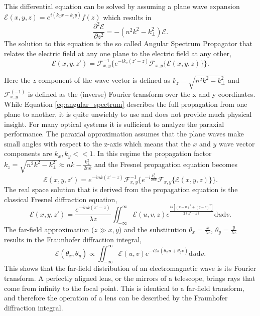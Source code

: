 \documentclass[letterpaper]{ar-1col}
\begin{document}
This differential equation can be solved by assuming a plane wave expansion $\mathcal{E}(x,y,z)=e^{i(k_x x + k_y y)}f(z)$ which results in
\begin{equation}
\frac{\partial^2\mathcal{E}}{\partial z^2} = -(n^2k^2 - k_{\perp}^2)\mathcal{E}.
\end{equation}
The solution to this equation is the so called Angular Spectrum Propagator that relates the electric field at any one plane to the electric field at any other,
\begin{equation}
\label{eq:angular_spectrum}
\mathcal{E}(x, y, z') = \mathcal{F}_{x,y}^{-1}\{e^{-ik_z(z'-z)}\mathcal{F}_{x,y}\{\mathcal{E}(x,y,z)\}\}.
\end{equation}

Here the $z$ component of the wave vector is defined as $k_z=\sqrt{n^2k^2 - k_{\perp}^2}$ and $\mathcal{F}_{x,y}^{(-1)}$ is defined as the (inverse) Fourier transform over the x and y coordinates.
%
While Equation \ref{eq:angular_spectrum} describes the full propagation from one plane to another, it is quite unwieldy to use and does not provide much physical insight.
%
For many optical systems it is sufficient to analyze the paraxial performance.
%
The paraxial approximation assumes that the plane waves make small angles with respect to the z-axis which means that the $x$ and $y$ wave vector components are $k_x,k_y<<1$.
%
In this regime the propagation factor $k_z=\sqrt{n^2k^2 - k_{\perp}^2}\approx nk - \frac{k_{\perp}^2}{2nk}$ and the Fresnel propagation equation becomes
\begin{equation}
\label{eq:angular_spectrum2}
\mathcal{E}(x, y, z') = e^{-ink(z'-z)} \mathcal{F}_{x,y}^{-1}\{ e^{-i\frac{k_{\perp}^2}{2nk}} \mathcal{F}_{x,y}\{\mathcal{E}(x,y,z)\}\}.
\end{equation}
The real space solution that is derived from the propagation equation is the classical Fresnel diffraction equation,
\begin{equation}
\label{eq:fresnel_diffraction}
\mathcal{E}(x, y, z') = \frac{e^{-ink(z'-z)}}{\lambda z} \iint_{-\infty}^{\infty} \mathcal{E}(u, v, z) e^{\frac{ik\left[(x - u)^2 + (y - v)^2\right]}{2 (z' - z)}} \mathrm{d}u \mathrm{d}v.
\end{equation}
The far-field approximation ($z \gg x, y$) and the substitution $\theta_x = \frac{x}{\lambda z}$, $\theta_y = \frac{y}{\lambda z}$ results in the Fraunhofer diffraction integral,
\begin{equation}
\label{eq:fraunhofer_diffraction}
\mathcal{E}(\theta_x, 
\theta_y) \propto \iint_{-\infty}^{\infty} \mathcal{E}(u, v) e^{-i2\pi(\theta_x u + \theta_y v)} \mathrm{d}u \mathrm{d}v.
\end{equation}
This shows that the far-field distribution of an electromagnetic wave is its Fourier transform.
%
A perfectly aligned lens, or the mirrors of a telescope, brings rays that come from infinity to the focal point.
%
This is identical to a far-field transform, and therefore the operation of a lens can be described by the Fraunhofer diffraction integral.
\end{document}
